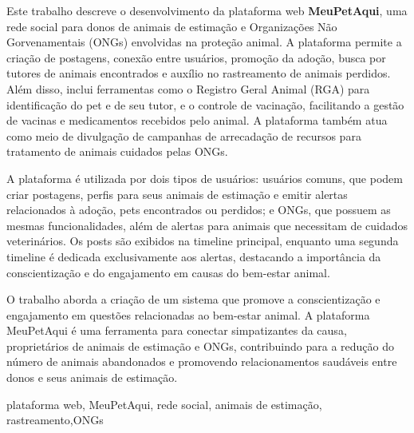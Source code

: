 \clearpage\newpage\pagebreak%
\pagestyle{plain}

\Resumo 
Este trabalho descreve o desenvolvimento da plataforma web {\bf MeuPetAqui}, uma rede social para donos de animais de estimação e Organizações Não Gorvenamentais (\gls{ONGs}) envolvidas na proteção animal. A plataforma permite a criação de postagens, conexão entre usuários, promoção da adoção, busca por tutores de animais encontrados e auxílio no rastreamento de animais perdidos. Além disso, inclui ferramentas como o Registro Geral Animal (\gls{RGA}) para identificação do pet e de seu tutor, e o controle de vacinação, facilitando a gestão de vacinas e medicamentos recebidos pelo animal. A plataforma também atua como meio de divulgação de campanhas de arrecadação de recursos para tratamento de animais cuidados pelas ONGs.

A plataforma é utilizada por dois tipos de usuários: usuários comuns, que podem criar postagens, perfis para seus animais de estimação e emitir alertas relacionados à adoção, pets encontrados ou perdidos; e ONGs, que possuem as mesmas funcionalidades, além de alertas para animais que necessitam de cuidados veterinários. Os posts são exibidos na timeline principal, enquanto uma segunda timeline é dedicada exclusivamente aos alertas, destacando a importância da conscientização e do engajamento em causas do bem-estar animal.

O trabalho aborda a criação de um sistema que promove a conscientização e engajamento em questões relacionadas ao bem-estar animal. A plataforma MeuPetAqui é uma ferramenta para conectar simpatizantes da causa, proprietários de animais de estimação e ONGs, contribuindo para a redução do número de animais abandonados e promovendo relacionamentos saudáveis entre donos e seus animais de estimação.
\begin{keywords}
plataforma web, MeuPetAqui, rede social, animais de estimação, rastreamento,ONGs
\end{keywords}